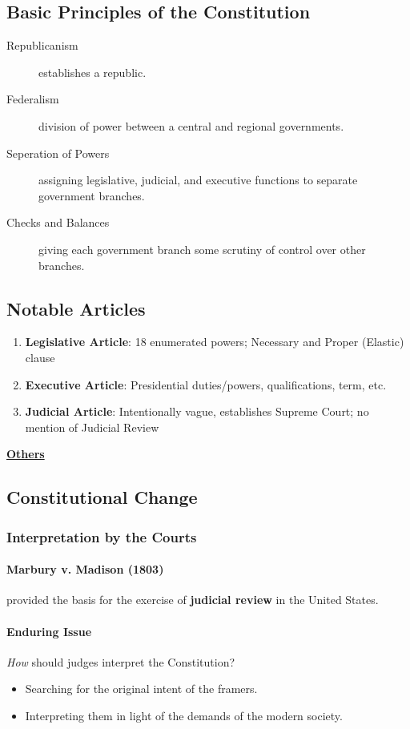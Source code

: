 \subsection{Basic Principles of the Constitution}
\begin{description}
    \item[Republicanism] establishes a republic.
    \item[Federalism] division of power between a central and regional governments.
    \item[Seperation of Powers] assigning legislative, judicial, and executive functions to separate government branches.
    \item[Checks and Balances] giving each government branch some scrutiny of control over other branches.
\end{description}

\subsection{Notable Articles}
\begin{enumerate}[label=\Roman*.]
    \item \textbf{Legislative Article}: 18 enumerated powers; Necessary and Proper (Elastic) clause
    \item \textbf{Executive Article}: Presidential duties/powers, qualifications, term, etc.
    \item \textbf{Judicial Article}: Intentionally vague, establishes Supreme Court; no mention of Judicial Review
\end{enumerate}
\underline{\textbf{Others}}

\subsection{Constitutional Change}


\subsubsection{Interpretation by the Courts}
\paragraph{Marbury v. Madison (1803)}
provided the basis for the exercise of \textbf{judicial review} in the United States.
\paragraph{Enduring Issue}
\textit{How} should judges interpret the Constitution?
\begin{itemize}
    \item Searching for the original intent of the framers.
    \item Interpreting them in light of the demands of the modern society.
\end{itemize}

